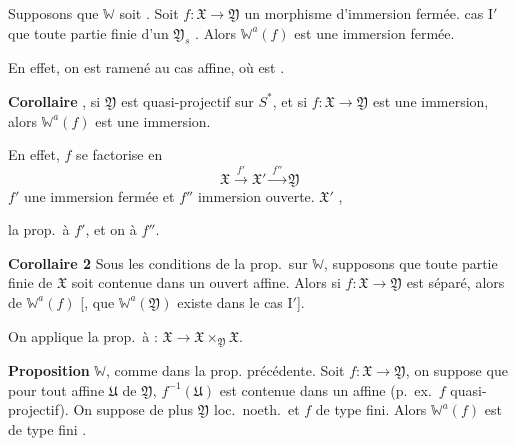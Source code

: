 \documentclass[11pt,a4paper]{article}
\begin{document}
\textbf{} Supposons que $\mathbb{W}$ soit
\struck{\ill{}} .
Soit $f\colon \mathfrak{X} \to \mathfrak{Y}$ un morphisme
 d'immersion
\struck{\ill{}} fermée.  \ill{}
cas I$'$ que 
 \ill{} toute partie
finie d'un $\mathfrak{Y}_s$ 
.
 
Alors $\mathbb{W}^{a}(f)$  est une immersion fermée.

En effet, on est ramené au cas affine, où
 est .

\textbf{Corollaire} ,
si $\mathfrak{Y}$ est quasi-projectif sur $S^{*}$, et si
$f\colon \mathfrak{X} \to \mathfrak{Y}$ est une immersion, alors
$\mathbb{W}^{a}(f)$ est une immersion.

En effet, $f$ se factorise en
\[
  \mathfrak{X} \xrightarrow{\ f'\ } \mathfrak{X}' \xrightarrow{\ f''\ }
  \mathfrak{Y}
\]
 $f'$ une immersion fermée et $f''$ immersion
ouverte. $\mathfrak{X}'$  \ill{} \ill{}
\ill{}, \ill{}

 la prop.\ à $f'$, et on  \ill{} à $f''$.

\struck{\ill{}} \textbf{Corollaire 2} Sous les conditions de la prop.\ sur
$\mathbb{W}$, \struck{\ill{}} supposons que  toute partie finie de $\mathfrak{X}$
soit contenue dans un ouvert affine. Alors si $f\colon \mathfrak{X} \to
\mathfrak{Y}$ est séparé, alors \ill{} \ill{} \ill{} de $\mathbb{W}^{a}(f)$
[\ill{},  que $\mathbb{W}^{a}(\mathfrak{Y})$ existe dans
le cas I$'$].

On applique la prop.\ à : $\mathfrak{X} \to \mathfrak{X}
\times_{\mathfrak{Y}} \mathfrak{X}$.

\textbf{Proposition} $\mathbb{W}$, \struck{\ill{}} comme dans la prop.
précédente. Soit $f\colon \mathfrak{X} \to \mathfrak{Y}$, on
suppose   que pour tout
 affine $\mathfrak{U}$ de
$\mathfrak{Y}$, 
$f^{-1}(\mathfrak{U})$ est \struck{\ill{}} contenue dans un  affine
(p.\ ex.\ $f$ quasi-projectif). On suppose de plus
$\mathfrak{Y}$ \struck{\ill{}} loc.\ noeth.\ et $f$ de type fini. Alors
$\mathbb{W}^{a}(f)$ est de type fini .
\end{document}
